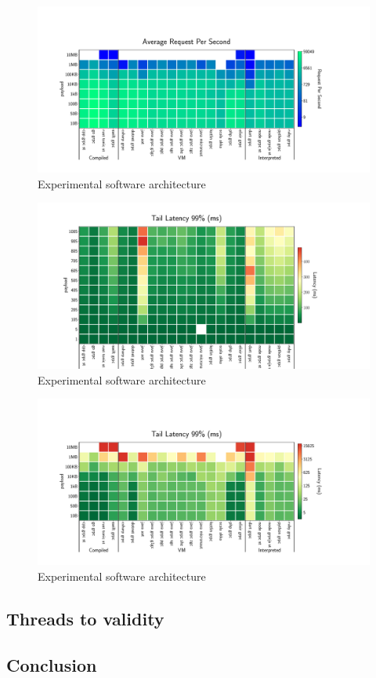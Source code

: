 \begin{figure}[!hbt]
    \begin{center}
        \includegraphics[width=1.2\linewidth]{imgs/rps_payload}
    \end{center}
    \caption{Experimental software architecture}\label{fig:rps_payload}
\end{figure}



\begin{figure}[!hbt]
    \begin{center}
        \includegraphics[width=1.2\linewidth]{imgs/tail99_clients}
    \end{center}
    \caption{Experimental software architecture}\label{fig:tail99_clients}
\end{figure}


\begin{figure}[!hbt]
    \begin{center}
        \includegraphics[width=1.2\linewidth]{imgs/tail99_payload}
    \end{center}
    \caption{Experimental software architecture}\label{fig:tail99_payload}
\end{figure}


\subsection{Threads to validity}



\subsection{Conclusion}
